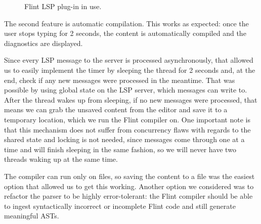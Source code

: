 \begin{figure}[htbp]
\centering
{}
\caption{Flint LSP plug-in in use.}
\label{lsp-use}
\end{figure}

The second feature is automatic compilation. This works as expected: once the user stops typing for 2 seconds, the content is automatically compiled and the diagnostics are displayed.

Since every LSP message to the server is processed asynchronously, that allowed us to easily implement the timer by sleeping the thread for 2 seconds and, at the end, check if any new messages were processed in the meantime. That was possible by using global state on the LSP server, which messages can write to. After the thread wakes up from sleeping, if no new messages were processed, that means we can grab the unsaved content from the editor and save it to a temporary location, which we run the Flint compiler on. One important note is that this mechanism does not suffer from concurrency flaws with regards to the shared state and locking is not needed, since messages come through one at a time and will finish sleeping in the same fashion, so we will never have two threads waking up at the same time.

The compiler can run only on files, so saving the content to a file was the easiest option that allowed us to get this working. Another option we considered was to refactor the parser to be highly error-tolerant: the Flint compiler should be able to ingest syntactically incorrect or incomplete Flint code and still generate meaningful ASTs. 

